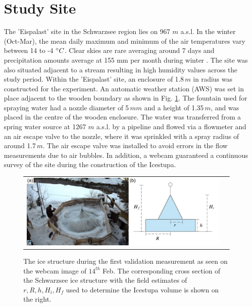 \documentclass[utf8]{frontiersSCNS} %
\begin{document}
\section{Study Site} The 'Eispalast' site in the Schwarzsee region lies on 967 $m$ a.s.l. In the winter (Oct-Mar), the
mean daily maximum and minimum of the air temperatures vary between 14 to -4 $\degree C$. Clear skies are rare averaging
around 7 days and precipitation amounts average at 155 mm per month during winter \citep{eispalast}. The site was also
situated adjacent to a stream resulting in high humidity values across the study period. Within the 'Eispalast' site, an
enclosure of 1.8\,$m$ in radius was constructed for the experiment. An automatic weather station (AWS) was set in place
adjacent to the wooden boundary as shown in Fig. \ref{fig:site}. The fountain used for spraying water had a nozzle
diameter of 5\,$mm$ and a height of 1.35\,$m$, and was placed in the centre of the wooden enclosure. The water was
transferred from a spring water source at 1267 $m$ a.s.l. by a pipeline and flowed via a flowmeter and an air escape
valve to the nozzle, where it was sprinkled with a spray radius of around 1.7\,$m$. The air escape valve was installed
to avoid errors in the flow measurements due to air bubbles. In addition, a webcam guaranteed a continuous survey of the
site during the construction of the Icestupa. 

\begin{figure}[htb] \centering \begin{tabular}{@{}cc@{}} \includegraphics[width=15cm]{./Figures/Figure_2.jpg} &
\end{tabular} \caption{The ice structure during the first validation measurement as seen on the webcam image of
$14^{th}$ Feb. The corresponding cross section of the Schwarzsee ice structure with the field estimates of $r, R, h,
H_i, H_f$ used to determine the Icestupa volume is shown on the right.} \label{fig:site} \end{figure}
\end{document}
